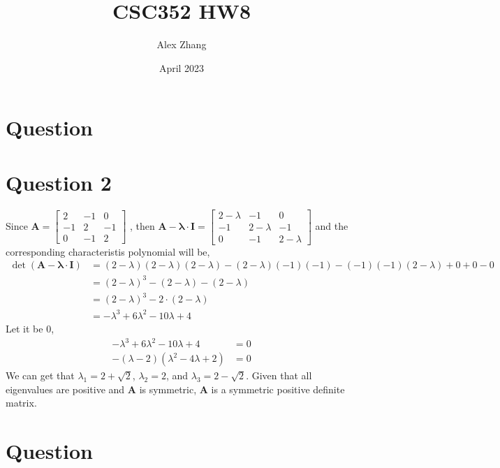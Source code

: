 \documentclass{article}
\title{CSC352 HW8}
\author{Alex Zhang}
\date{April 2023}
\newcommand{\bmat}[1]{\begin{bmatrix} #1 \end{bmatrix}}
\newcommand{\mat}[1]{\mathbf{#1}}
\begin{document}
\maketitle
\section*{Question}

\section*{Question 2}
Since $\mat{A} = \bmat{2 & -1 & 0\\
                        -1 & 2 & -1\\
                        0 & -1 & 2}$
, then $\mat{A - \lambda \cdot I} =\bmat{2-\lambda & -1 & 0\\
-1 & 2-\lambda & -1\\
0 & -1 & 2-\lambda}$ and the corresponding characteristis polynomial will be,
\begin{align}
    \det(\mat{A - \lambda \cdot I}) &= (2-\lambda)(2-\lambda)(2-\lambda) -(2-\lambda)(-1)(-1) - (-1)(-1)(2-\lambda) + 0  + 0 - 0 \nonumber \\ 
    &= (2-\lambda)^3 - (2-\lambda) - (2-\lambda) \nonumber \\
    &= (2-\lambda)^3 - 2 \cdot (2-\lambda) \nonumber \\
    &= -\lambda^3 + 6\lambda^2 - 10 \lambda + 4 \nonumber
\end{align}
Let it be 0,
\begin{align}
    -\lambda^3 + 6\lambda^2 - 10 \lambda + 4 &= 0 \nonumber \\
    -(\lambda-2)(\lambda^2 - 4\lambda +2) &= 0 \nonumber
\end{align}
We can get that $\lambda_1 = 2+ \sqrt{2}$, $\lambda_2 = 2$, and $\lambda_3 = 2- \sqrt{2}$. Given that all eigenvalues
are positive and $\mat{A}$ is symmetric, $\mat{A}$ is a symmetric positive definite matrix.





\section*{Question}
\end{document}

